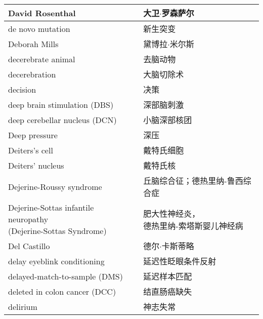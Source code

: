 \begin{longtable}{lll}
	\midrule
	David Rosenthal     &&  大卫$\cdot$罗森萨尔  \\
	
	\midrule
	de novo mutation     &&  新生突变  \\
	
	\midrule
	Deborah Mills     &&  黛博拉$\cdot$米尔斯  \\
	
	\midrule
	decerebrate animal     &&  去脑动物  \\
	
	\midrule
	decerebration     &&  大脑切除术  \\
	
	\midrule
	decision     &&  决策  \\
	
	\midrule
	deep brain stimulation (DBS)     &&  深部脑刺激  \\
	
	\midrule
	deep cerebellar nucleus (DCN)  &&  小脑深部核团  \\
	
	\midrule
	Deep pressure   &&  深压  \\
	
	\midrule
	Deiters's cell   &&  戴特氏细胞  \\
	
	\midrule
	Deiters' nucleus   &&  戴特氏核  \\
	
	\midrule
	Dejerine-Roussy syndrome   &&  丘脑综合征；德热里纳-鲁西综合症  \\
	
	\midrule
	\makecell[l]{Dejerine-Sottas infantile neuropathy \\ (Dejerine-Sottas Syndrome)}  &&  \makecell[l]{肥大性神经炎，\\德热里纳-索塔斯婴儿神经病}  \\
	
	\midrule
	Del Castillo   &&  德尔$\cdot$卡斯蒂略  \\
	
	\midrule
	delay eyeblink conditioning   &&  延迟性眨眼条件反射  \\
	
	\midrule
	delayed-match-to-sample  (DMS)   &&  延迟样本匹配  \\
	
	\midrule
	deleted in colon cancer (DCC)     &&  结直肠癌缺失  \\
	
	\midrule
	delirium     &&  神志失常  \\
	

\end{longtable}
